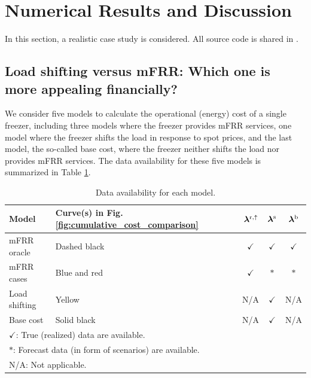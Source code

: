 \section{Numerical Results and Discussion}\label{sec:results}

In this section, a realistic case study is considered. All source code is shared in \cite{code}.

\subsection{Load shifting versus mFRR: Which one is more appealing financially?}

We consider five models to calculate the operational (energy) cost of a single freezer, including three models where the freezer provides mFRR services, one model where the freezer shifts the load in response to spot prices, and the last model, the so-called base cost, where the freezer neither shifts the load nor provides mFRR services. The data availability for these five models is summarized in
Table \ref{tab:price_visibility}.




\begin{table}[t]
    \caption{Data availability for each model.}
    \label{tab:price_visibility}
    \centering
    \begin{tabular}{llccc}
        \toprule
        Model         & Curve(s) in Fig. \ref{fig:cumulative_cost_comparison} & $\bm{\lambda}^{\rm{r},\uparrow}$ & $\bm{\lambda}^{\rm{s}}$ & $\bm{\lambda}^{\rm{b}}$ \\
        \midrule
        mFRR oracle   & Dashed black                                          & $\checkmark$                     & $\checkmark$            & $\checkmark$            \\
        mFRR cases    & Blue and red                                          & $\checkmark$                     & $\ast$                  & $\ast$                  \\
        Load shifting & Yellow                                                & N/A                              & $\checkmark$            & N/A                     \\
        Base cost     & Solid black                                           & N/A                              & $\checkmark$            & N/A                     \\
        \bottomrule
        \multicolumn{5}{l}{$\checkmark$: True (realized) data are available.}                                                                                        \\
        \multicolumn{5}{l}{$\ast$: Forecast data (in form of scenarios) are available.}                                                                              \\
        \multicolumn{5}{l}{N/A: Not applicable.}
    \end{tabular}
    \vspace{-2mm}
\end{table}





